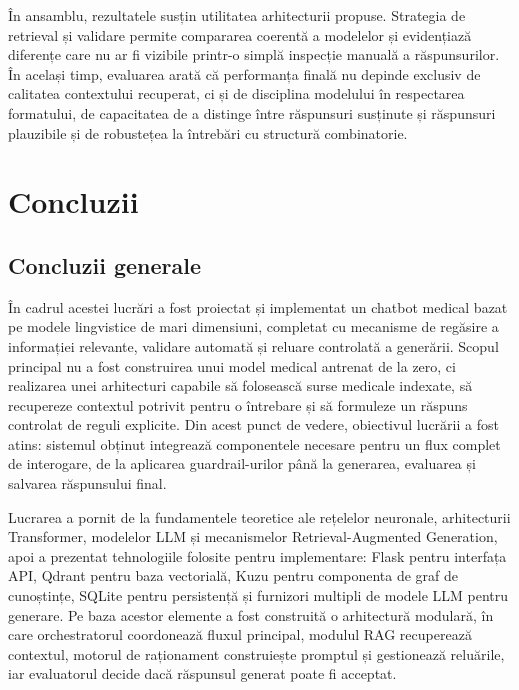 \documentclass[12pt, a4paper, oneside, romanian]{teza-upb}
\begin{document}
În ansamblu, rezultatele susțin utilitatea arhitecturii propuse. Strategia de retrieval și validare permite compararea coerentă a modelelor și evidențiază diferențe care nu ar fi vizibile printr-o simplă inspecție manuală a răspunsurilor. În același timp, evaluarea arată că performanța finală nu depinde exclusiv de calitatea contextului recuperat, ci și de disciplina modelului în respectarea formatului, de capacitatea de a distinge între răspunsuri susținute și răspunsuri plauzibile și de robustețea la întrebări cu structură combinatorie.


\chapter{Concluzii}
\section{Concluzii generale}

În cadrul acestei lucrări a fost proiectat și implementat un chatbot medical bazat pe modele lingvistice de mari dimensiuni, completat cu mecanisme de regăsire a informației relevante, validare automată și reluare controlată a generării. Scopul principal nu a fost construirea unui model medical antrenat de la zero, ci realizarea unei arhitecturi capabile să folosească surse medicale indexate, să recupereze contextul potrivit pentru o întrebare și să formuleze un răspuns controlat de reguli explicite. Din acest punct de vedere, obiectivul lucrării a fost atins: sistemul obținut integrează componentele necesare pentru un flux complet de interogare, de la aplicarea guardrail-urilor până la generarea, evaluarea și salvarea răspunsului final.

Lucrarea a pornit de la fundamentele teoretice ale rețelelor neuronale, arhitecturii Transformer, modelelor LLM și mecanismelor Retrieval-Augmented Generation, apoi a prezentat tehnologiile folosite pentru implementare: Flask pentru interfața API, Qdrant pentru baza vectorială, Kuzu pentru componenta de graf de cunoștințe, SQLite pentru persistență și furnizori multipli de modele LLM pentru generare. Pe baza acestor elemente a fost construită o arhitectură modulară, în care orchestratorul coordonează fluxul principal, modulul RAG recuperează contextul, motorul de raționament construiește promptul și gestionează reluările, iar evaluatorul decide dacă răspunsul generat poate fi acceptat.
\end{document}
